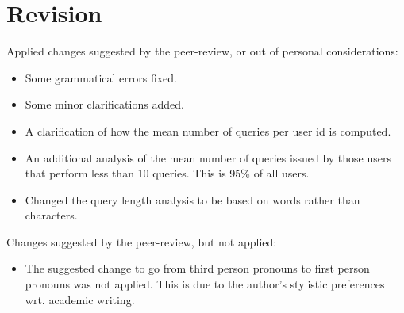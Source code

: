 
\section{Revision}

Applied changes suggested by the peer-review, or out of personal
considerations:

\begin{itemize}

\item Some grammatical errors fixed.

\item Some minor clarifications added.

\item A clarification of how the mean number of queries per user id is
computed.

\item An additional analysis of the mean number of queries issued by those
users that perform less than 10 queries. This is 95\% of all users.

\item Changed the query length analysis to be based on words rather than
characters.

\end{itemize}

Changes suggested by the peer-review, but not applied:

\begin{itemize}

\item The suggested change to go from third person pronouns to first person
pronouns was not applied. This is due to the author's stylistic preferences
wrt. academic writing.

\end{itemize}

